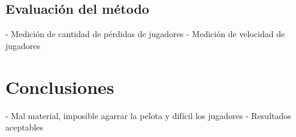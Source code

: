 \documentclass[a4paper,10pt]{article}
\begin{document}
\subsection{Evaluación del método}
  - Medición de cantidad de pérdidas de jugadores
  - Medición de velocidad de jugadores

\section{Conclusiones}

- Mal material, imposible agarrar la pelota y difícil los jugadores
- Resultados aceptables

\printbibliography



\begin{comment}

- Algoritmo de deteccion de fondo: cosas que no son la cancha en el video arruinan las mediciones
  => Poner en negro toda parte del video que no sea la cancha

- Funcion de feature de contornos activos
  + Tomar promedio de color del contorno inicial no soporta camisetas rayadas
  + Tampoco aguanta camisetas con mucha iluminacion
  => Busqueda de nuevos features
    - sigma
    - coeficiente de variacion: ???
    - distintos color-spaces: algunos color spaces funcionan mejor para un tipo de camiseta que otro. seria necesario tener varios features distintos y saber seleccionar el mejor

- Distorcion de la lente introduce error en la homografia
  => Algoritmos de correcion de la lente
     - El factor de correcion es distinto para cada video
     - Es dificil de calcular programaticamente

- Jugadores distantes se borronean mucho
  => ???

- La pelota es muy chica
  => ???

- Cuando un jugador marca a otro, suele recorrer mucha distancia oculto o semi oculto
  => ???

- Además de distorción de la lente, la RESOLUCION: al agarrar TODA la cancha en una toma los jugadores MUY chicos, y la pelota más
    => ???

- Las canchas tienen diferentes medidas (varían en un cierto rango). Esto afecta a la homografía
    => Adaptar la homografía a las dimensiones de cada cancha.

- Como relacionar posiciones relativas de los jugadores teniendo una vista 3D con perspectiva
    => Homografía
    (Muy básico?)

\end{comment}
\end{document}
